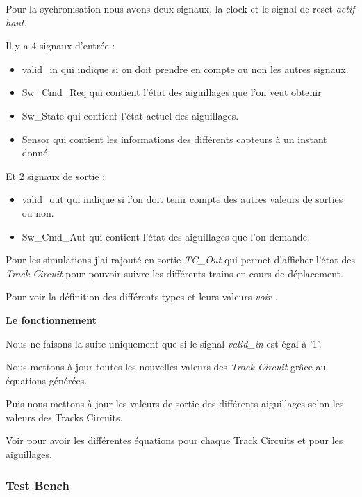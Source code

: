 Pour la sychronisation nous avons deux signaux, la clock et le signal
de reset \emph{actif haut}.

Il y a 4 signaux d'entrée :

\begin{itemize}
  \item valid\_in qui indique si on doit prendre en compte ou non les
    autres signaux.
  \item Sw\_Cmd\_Req qui contient l'état des aiguillages que l'on veut obtenir
  \item Sw\_State qui contient l'état actuel des aiguillages.
  \item Sensor qui contient les informations des différents capteurs à
    un instant donné.
\end{itemize}  

\newpage

Et 2 signaux de sortie :

\begin{itemize}
  \item valid\_out qui indique si l'on doit tenir compte des autres
    valeurs de sorties ou non.
  \item Sw\_Cmd\_Aut qui contient l'état des aiguillages que l'on demande.
\end{itemize}  

\medskip

Pour les simulations j'ai rajouté en sortie \emph{TC\_Out} qui permet
d'afficher l'état des \emph{Track Circuit} pour pouvoir suivre les
différents trains en cours de déplacement.

Pour voir la définition des différents types et leurs valeurs \emph{voir \cite{interface}}.

\bigskip

\textbf{Le fonctionnement}

Nous ne faisons la suite uniquement que si le signal \emph{valid\_in} est égal à '1'.

Nous mettons à jour toutes les nouvelles valeurs des \emph{Track
  Circuit} grâce au équations générées.

Puis nous mettons à jour les valeurs de sortie des différents
aiguillages selon les valeurs des Tracks Circuits.

\smallskip

Voir \cite{interface} pour avoir les différentes équations pour chaque Track
Circuits et pour les aiguillages.

\subsubsection{\underline{Test Bench}}
\label{sec:Test_Bench}

